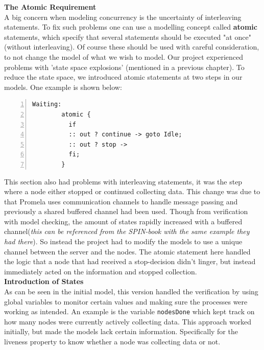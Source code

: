 \textbf{The Atomic Requirement} \\


A big concern when modeling concurrency is the uncertainty of interleaving statements. To fix such problems one can use a modelling concept called \textbf{atomic} statements, which specify that several statements should be executed "at once" (without interleaving). Of course these should be used with careful consideration, to not change the model of what we wish to model. Our project experienced problems with 'state space explosions' (mentioned in a previous chapter). To reduce the state space, we introduced atomic statements at two steps in our models. One example is shown below:

\begin{lstlisting}[caption={Atomic statement},language=Promela, numbers=left, basicstyle=\footnotesize, tabsize=2]
Waiting:
        atomic {
          if
          :: out ? continue -> goto Idle;
          :: out ? stop -> 
          fi;
        }
\end{lstlisting}

This section also had problems with interleaving statements, it was the step where a node either stopped or continued collecting data. This change was due to that Promela uses communication channels to handle message passing and previously a shared buffered channel had been used. Though from verification with model checking, the amount of states rapidly increased with a buffered channel(\textit{this can be referenced from the SPIN-book with the same example they had there}). So instead the project had to modify the models to use a unique channel between the server and the nodes. The atomic statement here handled the logic that a node that had received a stop-decision didn't linger, but instead immediately acted on the information and stopped collection. \\

\textbf{Introduction of States} \\


As can be seen in the initial model, this version handled the verification by using global variables to monitor certain values and making sure the processes were working as intended. An example is the variable \texttt{nodesDone} which kept track on how many nodes were currently actively collecting data. This approach worked initially, but made the models lack certain information. Specifically for the liveness property to know whether a node was collecting data or not. \\ 

